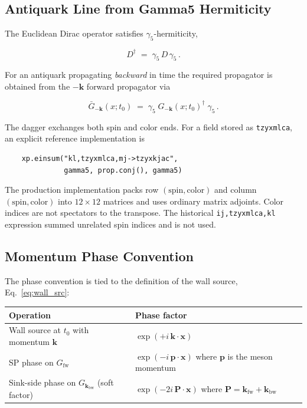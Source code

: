 \documentclass[11pt,a4paper]{article}
\newcommand{\Gfive}{\gamma_{5}}
\newcommand{\gbar}[1]{\bar{#1}}
\newcommand{\walltag}[1]{\texttt{#1}}
\begin{document}
\subsection{Antiquark Line from Gamma5 Hermiticity}

The Euclidean Dirac operator satisfies $\gamma_{5}$-hermiticity,

\begin{equation}\label{eq:gamma5_herm}
D^{\dagger} \;=\; \Gfive\, D\, \Gfive\, .
\end{equation}

For an antiquark propagating \emph{backward} in time the required propagator is
obtained from the $-\mathbf{k}$ forward propagator via

\begin{equation}\label{eq:antiquark}
\gbar{G}_{-\mathbf{k}}(x; t_{0})
   \;=\; \Gfive \; G_{-\mathbf{k}}(x; t_{0})^{\dagger} \; \Gfive\, .
\end{equation}


The dagger exchanges both spin and color ends. For a field stored as
\walltag{tzyxmlca}, an explicit reference implementation is
\begin{verbatim}
    xp.einsum("kl,tzyxmlca,mj->tzyxkjac",
              gamma5, prop.conj(), gamma5)
\end{verbatim}
The production implementation packs row $(\mathrm{spin},\mathrm{color})$ and
column $(\mathrm{spin},\mathrm{color})$ into $12\times12$ matrices and uses
ordinary matrix adjoints. Color indices are not spectators to the transpose.
The historical \walltag{ij,tzyxmlca,kl} expression summed unrelated spin
indices and is not used.


\subsection{Momentum Phase Convention}

The phase convention is tied to the definition of the wall source, Eq.~\eqref{eq:wall_src}:

\begin{center}
\begin{tabular}{ll}
\toprule
Operation & Phase factor \\
\midrule
Wall source at $t_{0}$ with momentum $\mathbf{k}$
   & $\exp(+i\,\mathbf{k}\!\cdot\!\mathbf{x})$ \\[4pt]
SP phase on $G_{\mathrm{fw}}$
   & $\exp(-i\,\mathbf{p}\!\cdot\!\mathbf{x})$ where $\mathbf{p}$ is the meson momentum \\[4pt]
Sink-side phase on $G_{\mathbf{k}_{\mathrm{bw}}}$ (soft factor)
   & $\exp(-2i\,\mathbf{P}\!\cdot\!\mathbf{x})$ where $\mathbf{P}=\mathbf{k}_{\mathrm{fw}}+\mathbf{k}_{\mathrm{bw}}$ \\
\bottomrule
\end{tabular}
\end{center}
\end{document}
